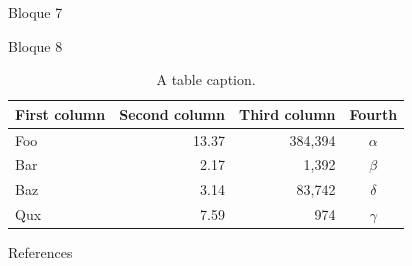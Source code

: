 \documentclass[final]{beamer}
\newlength{\sepwidth}
\newlength{\colwidth}
\newcommand{\separatorcolumn}{\begin{column}{\sepwidth}\end{column}}
\begin{document}
\begin{frame}[t]
\begin{columns}[t]
\begin{column}{\colwidth}
\begin{exampleblock}{Bloque 7}
  \end{exampleblock}
  \begin{block}{Bloque 8}


    \begin{table}
      \centering
      \begin{tabular}{l r r c}
        \toprule
        \textbf{First column} & \textbf{Second column} & \textbf{Third column} & \textbf{Fourth} \\
        \midrule
        Foo & 13.37 & 384,394 & $\alpha$ \\
        Bar & 2.17 & 1,392 & $\beta$ \\
        Baz & 3.14 & 83,742 & $\delta$ \\
        Qux & 7.59 & 974 & $\gamma$ \\
        \bottomrule
      \end{tabular}
      \caption{A table caption.}
    \end{table}

  \end{block}
  \begin{block}{References}

    \nocite{*}
    \footnotesize{}

  \end{block}

\end{column}

\separatorcolumn
\end{columns}
\end{frame}
\end{document}

